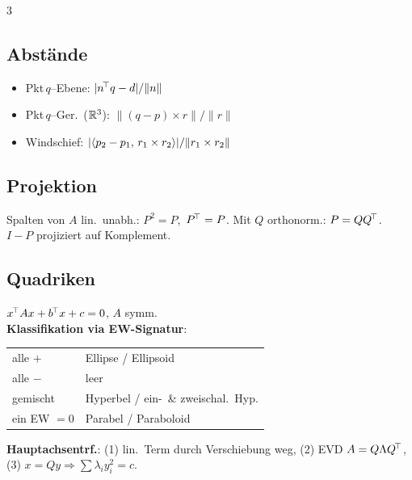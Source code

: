 \documentclass[8pt,a4paper]{extarticle}
\begin{document}
\begin{multicols*}{3}
\subsection{Abst\"ande}
\begin{itemize}
\item Pkt\,$q$--Ebene: $|n^{\!\top} q-d|/\|n\|$
\item Pkt\,$q$--Ger.\ ($\mathbb{R}^3$): $\|(q-p)\times r\|/\|r\|$
\item Windschief: $|\langle p_2-p_1,\,r_1\times r_2\rangle|/\|r_1\times r_2\|$
\end{itemize}

\subsection{Projektion}
Spalten von $A$ lin.\ unabh.:
$P^2=P$,\ $P^{\!\top}=P$. Mit $Q$ orthonorm.: $P=QQ^{\!\top}$.\ $I-P$ projiziert auf Komplement.

\subsection{Quadriken}
$x^{\!\top} Ax+b^{\!\top} x+c=0$, $A$ symm.\\
\textbf{Klassifikation via EW-Signatur}:
\begin{tabularx}{\linewidth}{@{}l@{\ }X@{}}
alle $+$ & Ellipse / Ellipsoid \\
alle $-$ & leer \\
gemischt & Hyperbel / ein-\ \& zweischal.\ Hyp. \\
ein EW $=0$ & Parabel / Paraboloid \\
\end{tabularx}
\textbf{Hauptachsentrf.}: (1) lin.\ Term durch Verschiebung weg, (2) EVD $A=Q\Lambda Q^{\!\top}$, (3) $x=Qy\Rightarrow\sum\lambda_i y_i^2=c$.


\end{multicols*}
\end{document}
